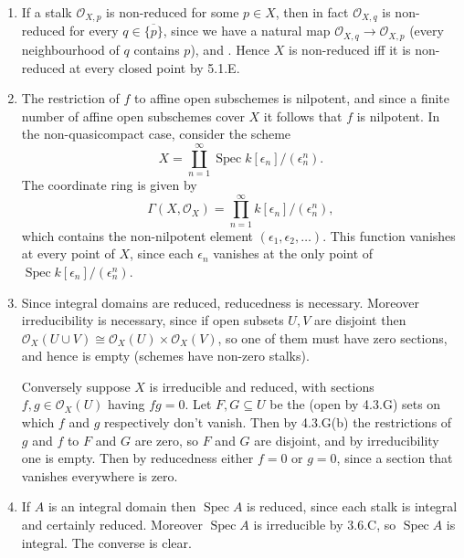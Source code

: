 \documentclass{report}
\newcommand{\closure}[1]{\overline{#1}} %
\renewcommand{\O}{\mathscr{O}} %
\DeclareMathOperator{\Spec}{Spec}
\begin{document}
\begin{enumerate}[label=\textbf{5.2.\Alph*.}]
	\item If a stalk $\O_{X,p}$ is non-reduced for some $p\in X$, then in fact
	      $\O_{X,q}$ is non-reduced for every $q\in\closure{\{p\}}$, since we have
	      a natural map $\O_{X,q}\to\O_{X,p}$ (every neighbourhood of $q$ contains
	      $p$), and . Hence $X$ is non-reduced iff it is non-reduced at every
	      closed point by 5.1.E.

	\item The restriction of $f$ to affine open subschemes is nilpotent, and
	      since a finite number of affine open subschemes cover $X$ it follows
	      that $f$ is nilpotent. In the non-quasicompact case, consider the scheme
	      \begin{equation*}
		      X = \coprod_{n=1}^\infty\Spec k[\epsilon_n]/(\epsilon_n^n).
	      \end{equation*}
	      The coordinate ring is given by
	      \begin{equation*}
		      \Gamma(X,\O_X) = \prod_{n=1}^\infty k[\epsilon_n]/(\epsilon_n^n),
	      \end{equation*}
	      which contains the non-nilpotent element
	      $(\epsilon_1,\epsilon_2,\ldots)$. This function vanishes at every point
	      of $X$, since each $\epsilon_n$ vanishes at the only point of
	      $\Spec k[\epsilon_n]/(\epsilon_n^n)$.

	\item Since integral domains are reduced, reducedness is necessary. Moreover
	      irreducibility is necessary, since if open subsets $U,V$ are disjoint
	      then $\O_X(U\cup V)\cong\O_X(U)\times\O_X(V)$, so one of them must have
	      zero sections, and hence is empty (schemes have non-zero stalks).

	      Conversely suppose $X$ is irreducible and reduced, with sections
	      $f,g\in\O_X(U)$ having $fg=0$. Let $F,G\subseteq U$ be the (open by
	      4.3.G) sets on which $f$ and $g$ respectively don't vanish. Then by
	      4.3.G(b) the restrictions of $g$ and $f$ to $F$ and $G$ are zero, so
	      $F$ and $G$ are disjoint, and by irreducibility one is empty. Then by
	      reducedness either $f=0$ or $g=0$, since a section that vanishes
	      everywhere is zero.

	\item If $A$ is an integral domain then $\Spec A$ is reduced, since each
	      stalk is integral and certainly reduced. Moreover $\Spec A$ is
	      irreducible by 3.6.C, so $\Spec A$ is integral. The converse is clear.


\end{enumerate}
\end{document}
